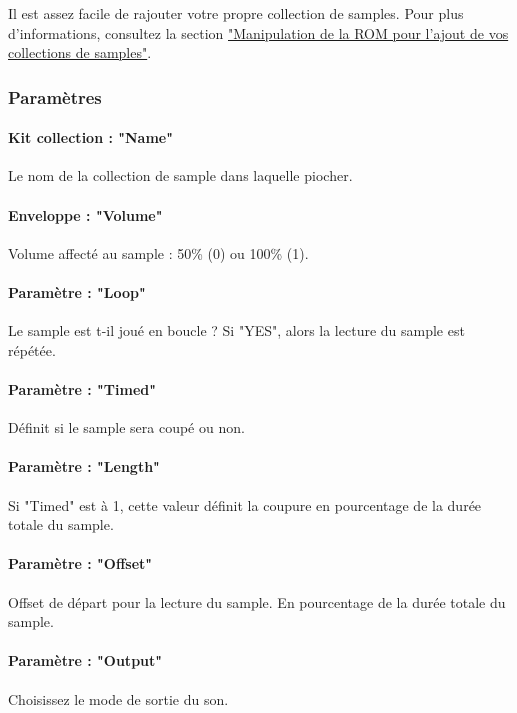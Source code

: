 Il est assez facile de rajouter votre propre collection de samples. Pour plus d'informations, consultez la section \hyperref[sec:addsamples]{"Manipulation de la ROM pour l'ajout de vos collections de samples"}.


\subsubsection{Paramètres}

\paragraph{Kit collection : "Name"} Le nom de la collection de sample dans laquelle piocher.

\paragraph{Enveloppe : "Volume"} Volume affecté au sample : 50\% (0) ou 100\% (1).

\paragraph{Paramètre : "Loop"} Le sample est t-il joué en boucle ?
                                Si "YES", alors la lecture du sample est répétée.

\paragraph{Paramètre : "Timed"} Définit si le sample sera coupé ou non.

\paragraph{Paramètre : "Length"} Si "Timed" est à 1, cette valeur définit la coupure en pourcentage de la durée totale du sample.

\paragraph{Paramètre : "Offset"} Offset de départ pour la lecture du sample.
                                En pourcentage de la durée totale du sample.

\paragraph{Paramètre : "Output"} Choisissez le mode de sortie du son.
\medskip

